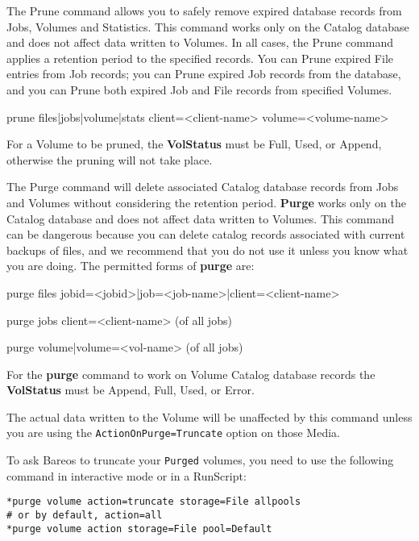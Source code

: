 \begin{description}
{\item [prune]
   \label{ManualPruning}
   The Prune command allows you to safely remove expired database records from
   Jobs, Volumes and Statistics.  This command works only on the Catalog
   database and does not affect data written to Volumes.  In all cases, the
   Prune command applies a retention period to the specified records.  You can
   Prune expired File entries from Job records; you can Prune expired Job
   records from the database, and you can Prune both expired Job and File
   records from specified Volumes.

prune files|jobs|volume|stats client={\textless}client-name{\textgreater}
volume={\textless}volume-name{\textgreater}

   For a Volume to be pruned, the {\bf VolStatus} must be Full, Used, or
   Append, otherwise the pruning will not take place.

\item [purge]
   The Purge command will delete associated Catalog database records from
   Jobs and Volumes without considering the retention period.  {\bf Purge}
   works only on the Catalog database and does not affect data written to
   Volumes.  This command can be dangerous because you can delete catalog
   records associated with current backups of files, and we recommend that
   you do not use it unless you know what you are doing.  The permitted
   forms of {\bf purge} are:

purge files jobid={\textless}jobid{\textgreater}|job={\textless}job-name{\textgreater}|client={\textless}client-name{\textgreater}

purge jobs client={\textless}client-name{\textgreater} (of all jobs)

purge volume|volume={\textless}vol-name{\textgreater} (of all jobs)

For the {\bf purge} command to work on Volume Catalog database  records the
{\bf VolStatus}  must be Append, Full, Used, or Error.

The actual data written to the Volume will be unaffected by this command unless
you are using the \texttt{ActionOnPurge=Truncate} option on those Media.

To ask Bareos to truncate your \texttt{Purged} volumes, you need to use the
following command in interactive mode or in a RunScript:
\begin{verbatim}
*purge volume action=truncate storage=File allpools
# or by default, action=all
*purge volume action storage=File pool=Default
\end{verbatim}

}
\end{description}
